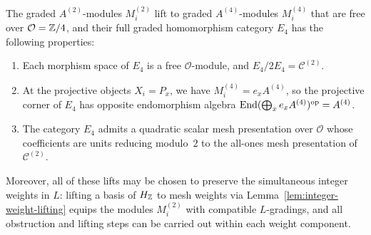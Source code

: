 \begin{proposition}
\label{prop:fixed-integral-companion}
The graded $A^{(2)}$-modules $M_i^{(2)}$ lift to graded $A^{(4)}$-modules $M_i^{(4)}$ that are free over $\mathcal O=\mathbb Z/4$, and their full graded homomorphism category $E_4$ has the following properties:
\begin{enumerate}[label={\upshape(\arabic*)}]
\item Each morphism space of $E_4$ is a free $\mathcal O$-module, and $E_4/2E_4=\mathcal C^{(2)}$.
\item At the projective objects $X_i=P_x$, we have $M_i^{(4)}=e_xA^{(4)}$, so the projective corner of $E_4$ has opposite endomorphism algebra $\operatorname{End}(\bigoplus_x e_xA^{(4)})^{\mathrm{op}}=A^{(4)}$.
\item The category $E_4$ admits a quadratic scalar mesh presentation over $\mathcal O$ whose coefficients are units reducing modulo~$2$ to the all-ones mesh presentation of $\mathcal C^{(2)}$.
\end{enumerate}
Moreover, all of these lifts may be chosen to preserve the simultaneous integer weights in $L$: lifting a basis of $H_\mathbb Z$ to mesh weights via Lemma~\ref{lem:integer-weight-lifting} equips the modules $M_i^{(2)}$ with compatible $L$-gradings, and all obstruction and lifting steps can be carried out within each weight component.
\end{proposition}
